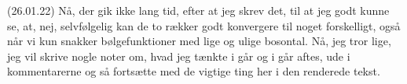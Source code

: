 \documentclass{report}
\begin{document}
(26.01.22) Nå, der gik ikke lang tid, efter at jeg skrev det, til at jeg godt kunne se, at, nej, selvfølgelig kan de to rækker godt konvergere til noget forskelligt, også når vi kun snakker bølgefunktioner med lige og ulige bosontal. Nå, jeg tror lige, jeg vil skrive nogle noter om, hvad jeg tænkte i går og i går aftes, ude i kommentarerne og så fortsætte med de vigtige ting her i den renderede tekst. 
\end{document}
